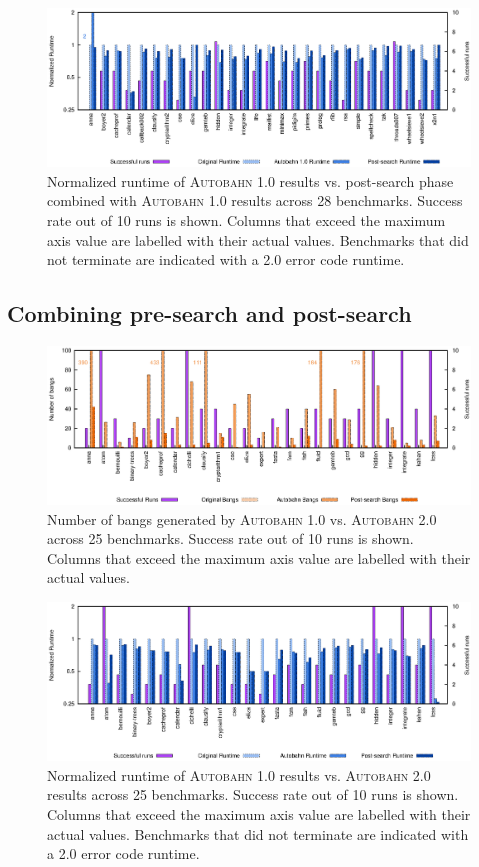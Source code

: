 \documentclass[format=sigplan, review=true]{acmart}
\newcommand{\Ao}[0]{\textsc{Autobahn 1.0}}
\newcommand{\At}[0]{\textsc{Autobahn 2.0}}
\newcommand{\preopt}[0]{pre-search}
\newcommand{\postopt}[0]{post-search}
\begin{document}
\begin{figure}
\includegraphics[width=\textwidth]{ap-partial}
\caption{Normalized runtime of \Ao{} results vs. \postopt{} phase combined with \Ao{} results across 28 benchmarks. Success rate out of 10 runs is shown. Columns that exceed the maximum axis value are labelled with their actual values. Benchmarks that did not terminate are indicated with a 2.0 error code runtime.}
\end{figure}

\subsection{Combining \preopt{} and \postopt{}}


\begin{figure}
\includegraphics[width=\textwidth]{pap1-bangs}
\caption{Number of bangs generated by \Ao{} vs. \At{} across 25 benchmarks. Success rate out of 10 runs is shown. Columns that exceed the maximum axis value are labelled with their actual values.}
\end{figure}

\begin{figure}
\includegraphics[width=\textwidth]{pap1}
\caption{Normalized runtime of \Ao{} results vs. \At{} results across 25 benchmarks. Success rate out of 10 runs is shown. Columns that exceed the maximum axis value are labelled with their actual values. Benchmarks that did not terminate are indicated with a 2.0 error code runtime.}
\end{figure}
\end{document}
